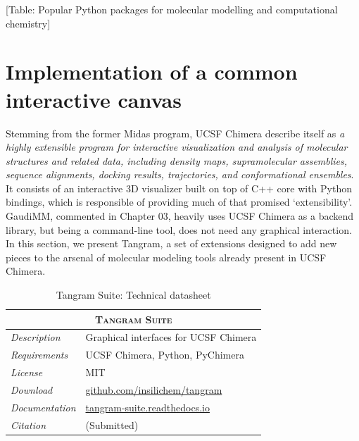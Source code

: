[Table: Popular Python packages for molecular modelling and computational chemistry]

\section{Implementation of a common interactive canvas}
Stemming from the former Midas program, UCSF Chimera describe itself as \textit{a highly extensible program for interactive visualization and analysis of molecular structures and related data, including density maps, supramolecular assemblies, sequence alignments, docking results, trajectories, and conformational ensembles}. It consists of an interactive 3D visualizer built on top of C++ core with Python bindings, which is responsible of providing much of that promised ‘extensibility’. GaudiMM, commented in Chapter 03, heavily uses UCSF Chimera as a backend library, but being a command-line tool, does not need any graphical interaction. In this section, we present Tangram, a set of extensions designed to add new pieces to the arsenal of molecular modeling tools already present in UCSF Chimera.


 \begin{table}[hbtp]
	\caption{Tangram Suite: Technical datasheet}
	\footnotesize
	\newcommand{\tableheading}[1]{\multicolumn{2}{c}{\textsc{#1}}}
	\begin{tabularx}{\textwidth}{RL}
		\toprule
		\tableheading{Tangram Suite}\\
		\toprule
		\textit{Description} & Graphical interfaces for UCSF Chimera\\
		\midrule
		\textit{Requirements} & UCSF Chimera, Python, PyChimera\\
		\midrule
		\textit{License} & MIT\\
		\midrule
		\textit{Download} & \href{https://github.com/insilichem/tangram}{github.com/insilichem/tangram} \\
		\midrule
		\textit{Documentation} & \href{http://tangram-suite.readthedocs.io}{tangram-suite.readthedocs.io} \\
		\midrule
		\textit{Citation} & (Submitted)\\
		\bottomrule

	\end{tabularx}
\end{table}




